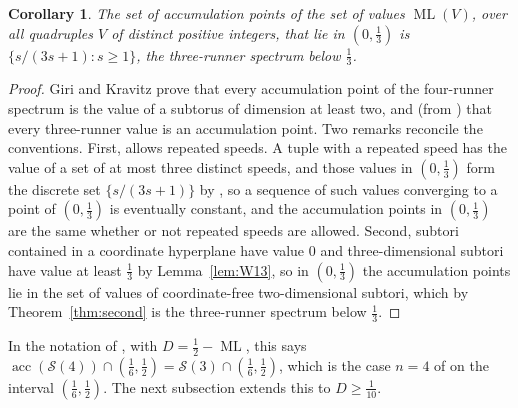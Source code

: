 \documentclass[12pt]{amsart}
\newtheorem{corollary}[theorem]{Corollary}
\theoremstyle{definition}\newtheorem{definition}[theorem]{Definition}
\theoremstyle{remark}\newtheorem{remark}[theorem]{Remark}
\newcommand{\ML}{\operatorname{ML}}
\begin{document}
\begin{corollary}\label{cor:acc}
The set of accumulation points of the set of values $\ML(V)$, over all quadruples $V$ of distinct positive integers, that lie in $(0,\frac13)$ is $\{s/(3s+1):s\ge1\}$, the three-runner spectrum below $\frac13$.
\end{corollary}
\begin{proof}
Giri and Kravitz prove \cite[Theorem~1.4]{GiriKravitz} that every accumulation point of the four-runner spectrum is the value of a subtorus of dimension at least two, and \cite[Theorem~1.3]{GiriKravitz} (from \cite{Kravitz}) that every three-runner value is an accumulation point. Two remarks reconcile the conventions. First, \cite{GiriKravitz} allows repeated speeds. A tuple with a repeated speed has the value of a set of at most three distinct speeds, and those values in $(0,\frac13)$ form the discrete set $\{s/(3s+1)\}$ by \cite[Theorems~5.1, 6.1 and 7.2]{Kravitz}, so a sequence of such values converging to a point of $(0,\frac13)$ is eventually constant, and the accumulation points in $(0,\frac13)$ are the same whether or not repeated speeds are allowed. Second, subtori contained in a coordinate hyperplane have value $0$ and three-dimensional subtori have value at least $\frac13$ by Lemma~\ref{lem:W13}, so in $(0,\frac13)$ the accumulation points lie in the set of values of coordinate-free two-dimensional subtori, which by Theorem~\ref{thm:second} is the three-runner spectrum below $\frac13$.
\end{proof}

In the notation of \cite{GiriKravitz}, with $D=\frac12-\ML$, this says $\operatorname{acc}(\mathcal S(4))\cap(\frac16,\frac12)=\mathcal S(3)\cap(\frac16,\frac12)$, which is the case $n=4$ of \cite[Conjecture~1.5]{GiriKravitz} on the interval $(\frac16,\frac12)$. The next subsection extends this to $D\ge\frac1{10}$.
\end{document}
